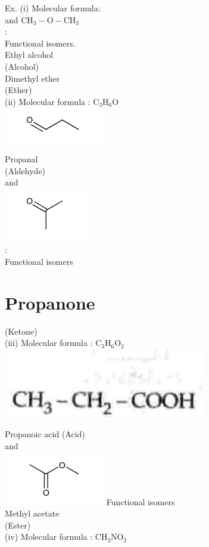 \documentclass[10pt]{article}
\begin{document}
Ex. (i) Molecular formula:\\
and $\mathrm{CH}_{3}-\mathrm{O}-\mathrm{CH}_{3}$\\
:\\
Functional isomers.\\
Ethyl alcohol\\
(Alcohol)\\
Dimethyl ether\\
(Ether)\\
(ii) Molecular formula : $\mathrm{C}_{3} \mathrm{H}_{6} \mathrm{O}$\\
\includegraphics{smile-8438d3a992fab866bf27b4a9586897a0ba6ec1bb}

Propanal\\
(Aldehyde)\\
and\\
\includegraphics{smile-1ada3ba1c2d4d242517d4e7ff7f3c1222661bae7}\\
:\\
Functional isomers

\section*{Propanone}
(Ketone)\\
(iii) Molecular formula : $\mathrm{C}_{3} \mathrm{H}_{6} \mathrm{O}_{2}$\\
\includegraphics[max width=\textwidth, center]{2025_01_28_8470952b98110cec3aabg-040(3)}

Propanoic acid (Acid)\\
and\\
\includegraphics{smile-23c75495dfdad29fefad708f12a0f7a1ebe99e68} Functional isomers\\
Methyl acetate\\
(Ester)\\
(iv) Molecular formula : $\mathrm{CH}_{3} \mathrm{NO}_{2}$\\
\end{document}
